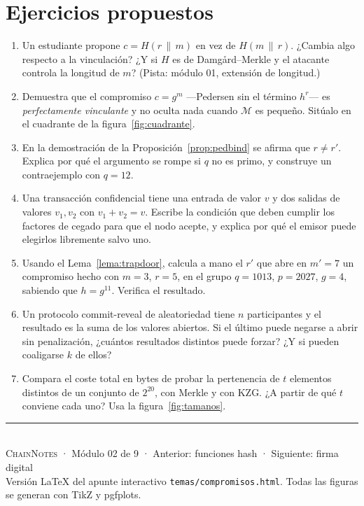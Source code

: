 \documentclass[11pt,a4paper]{article}
\theoremstyle{definition}
\theoremstyle{plain}
\theoremstyle{remark}
\newcommand{\concat}{\,\|\,}
\begin{document}
\section{Ejercicios propuestos}

\begin{enumerate}[leftmargin=2.4em,itemsep=0.5em]
  \item Un estudiante propone $c = H(r \concat m)$ en vez de $H(m \concat r)$.
    ¿Cambia algo respecto a la vinculación? ¿Y si $H$ es de Damgård--Merkle y el
    atacante controla la longitud de $m$? (Pista: módulo 01, extensión de
    longitud.)

  \item Demuestra que el compromiso $c = g^{m}$ ---Pedersen sin el término
    $h^{r}$--- es \emph{perfectamente vinculante} y no oculta nada cuando
    $\mathcal{M}$ es pequeño. Sitúalo en el cuadrante de la
    figura~\ref{fig:cuadrante}.

  \item En la demostración de la Proposición~\ref{prop:pedbind} se afirma que
    $r \neq r'$. Explica por qué el argumento se rompe si $q$ no es primo, y
    construye un contraejemplo con $q = 12$.

  \item Una transacción confidencial tiene una entrada de valor $v$ y dos salidas
    de valores $v_1, v_2$ con $v_1 + v_2 = v$. Escribe la condición que deben
    cumplir los factores de cegado para que el nodo acepte, y explica por qué el
    emisor puede elegirlos libremente salvo uno.

  \item Usando el Lema~\ref{lema:trapdoor}, calcula a mano el $r'$ que abre en
    $m' = 7$ un compromiso hecho con $m = 3$, $r = 5$, en el grupo $q = 1013$,
    $p = 2027$, $g = 4$, sabiendo que $h = g^{11}$. Verifica el resultado.

  \item Un protocolo commit-reveal de aleatoriedad tiene $n$ participantes y el
    resultado es la suma de los valores abiertos. Si el último puede negarse a
    abrir sin penalización, ¿cuántos resultados distintos puede forzar? ¿Y si
    pueden coaligarse $k$ de ellos?

  \item Compara el coste total en bytes de probar la pertenencia de $t$
    elementos distintos de un conjunto de $2^{20}$, con Merkle y con KZG. ¿A
    partir de qué $t$ conviene cada uno? Usa la figura~\ref{fig:tamanos}.
\end{enumerate}

\vfill
\begin{center}
\color{inkc}\small
\rule{0.35\textwidth}{0.4pt}\\[0.6em]
\textsc{ChainNotes} · Módulo 02 de 9 · Anterior: funciones hash · Siguiente: firma digital\\
{\footnotesize Versión LaTeX del apunte interactivo \texttt{temas/compromisos.html}.
Todas las figuras se generan con TikZ y pgfplots.}
\end{center}
\end{document}
